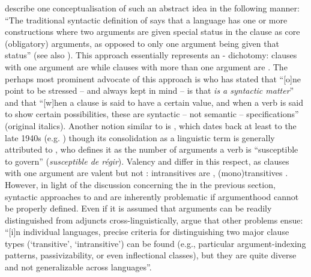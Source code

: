 \cite[471]{lapolla:al:2011} describe one conceptualisation of such an abstract idea in the following manner: “The traditional syntactic definition of  says that a language has one or more constructions where two arguments are given special status in the clause as core (obligatory) arguments, as opposed to only one argument being given that status” (see also \citealt[143]{croft:2003}). This approach essentially represents an - dichotomy: clauses with one argument are  while clauses with more than one argument are . The perhaps most prominent advocate of this approach is \cite[116]{dixon:2010b} who has stated that “[o]ne point to be stressed -- and always kept in mind -- is that \textit{ is a syntactic matter}” and that “[w]hen a clause is said to have a certain  value, and when a verb is said to show certain  possibilities, these are syntactic -- not semantic -- specifications” (original italics). Another notion similar to  is , which dates back at least to the late 1940s (e.g. \citealt[114f.]{de-groot:1949}) though its consolidation as a linguistic term is generally attributed to \cite[238, 670]{tesniere:1959}, who defines it as the number of arguments a verb is “susceptible to govern” (\textit{susceptible de régir}). Valency and  differ in this respect, as clauses with one argument are valent but not : intransitives are , (mono)transitives . However, in light of the discussion concerning the  in the previous section, syntactic approaches to  and  are inherently problematic if argumenthood cannot be properly defined. Even if it is assumed that arguments can be readily distinguished from adjuncts cross-linguistically, \cite[544]{haspelmath:2011a} argue that other problems ensue: “[i]n individual languages, precise criteria for distinguishing two major clause types (‘transitive’, ‘intransitive’) can be found (e.g., particular argument-indexing patterns, passivizability, or even inflectional classes), but they are quite diverse and not generalizable across languages”.

